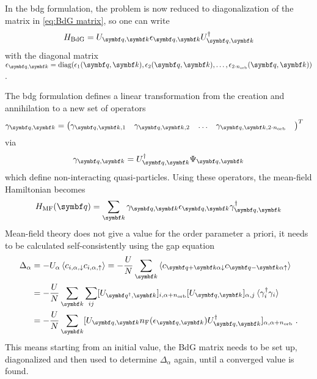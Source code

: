 \documentclass[../notes.tex]{subfiles}
\begin{document}
In the \acrshort{bdg} formulation, the problem is now reduced to diagonalization of the matrix in \cref{eq:BdG matrix}, so one can write
\begin{equation}
	H_{\mathrm{BdG}} = U_{\vb{q}, \vb{k}} \epsilon_{\vb{q}, \vb{k}} U_{\vb{q}, \vb{k}}^{\dagger}
\end{equation}
with the diagonal matrix \(\epsilon_{\vb{q}, \vb{k}} = \diag(\epsilon_1 (\vb{q}, \vb{k}), \epsilon_2 (\vb{q}, \vb{k}), \ldots, \epsilon_{2 \cdot n_{\mathrm{orb}}} (\vb{q}, \vb{k}))\).

The \acrshort{bdg} formulation defines a linear transformation from the creation and annihilation to a new set of operators
\begin{align}
	\gamma_{\vb{q}, \vb{k}} &= 
	\begin{pmatrix}
		\gamma_{\vb{q}, \vb{k},  1} &
		\gamma_{\vb{q}, \vb{k},  2} & 
		\ldots &
		\gamma_{\vb{q}, \vb{k},  2 \cdot n_{\mathrm{orb}}} & 
	\end{pmatrix}^{T}
\end{align}
via
\begin{equation}
	\gamma_{\vb{q}, \vb{k}} = U_{\vb{q}, \vb{k}}^{\dagger} \Psi_{\vb{q}, \vb{k}}
\end{equation}
which define non-interacting quasi-particles.
Using these operators, the mean-field Hamiltonian becomes
\begin{equation}
	H_{\mathrm{MF}} (\vb{q}) = \sum_{\vb{k}} \gamma_{\vb{q}, \vb{k}} \epsilon_{\vb{q}, \vb{k}} \gamma_{\vb{q}, \vb{k}}^{\dagger}
\end{equation}
Mean-field theory does not give a value for the order parameter a priori, it needs to be calculated self-consistently using the gap equation 
\begin{align}
	\Delta_{\alpha} &= -U_{\alpha} \braket{c_{i, \alpha, \downarrow} c_{i, \alpha, \uparrow}} = -\frac{U}{N} \sum_{\vb{k}} \braket{c_{\vb{q}+\vb{k} \alpha \downarrow} c_{\vb{q}-\vb{k} \alpha \uparrow}} \nonumber \\
	&= -\frac{U}{N} \sum_{\vb{k}} \sum_{ij} [U_{\vb{q}^{\dagger}, \vb{k}}]_{i, \alpha + n_{\mathrm{orb}}} [U_{\vb{q}, \vb{k}}]_{\alpha, j} \braket{\gamma_i^{\dagger} \gamma_i}  \\
	&= -\frac{U}{N} \sum_{\vb{k}} [U_{\vb{q}, \vb{k}} n_{\mathrm{F}} (\epsilon_{\vb{q}, \vb{k}}) U_{\vb{q}, \vb{k}}^{\dagger}]_{\alpha, \alpha + n_{\mathrm{orb}}} \nonumber \;.
\end{align}
This means starting from an initial value, the BdG matrix needs to be set up, diagonalized and then used to determine \(\Delta_{\alpha}\) again, until a converged value is found.
\end{document}
